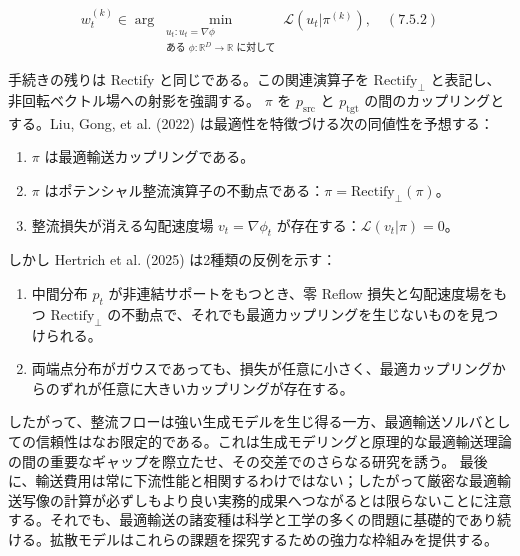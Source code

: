 \[
w_t^{(k)}\in\arg\min_{\substack{u_t:u_t=\nabla\phi\\\text{ある }\phi:\mathbb{R}^D\to\mathbb{R}\text{ に対して}}}\mathcal{L}(u_t|\pi^{(k)}), \quad (7.5.2)
\]


手続きの残りは Rectify と同じである。この関連演算子を $\mathrm{Rectify}_\perp$ と表記し、非回転ベクトル場への射影を強調する。
$\pi$ を $p_{\mathrm{src}}$ と $p_{\mathrm{tgt}}$ の間のカップリングとする。Liu, Gong, et al. (2022) は最適性を特徴づける次の同値性を予想する：

\begin{enumerate}
\item $\pi$ は最適輸送カップリングである。
\item $\pi$ はポテンシャル整流演算子の不動点である：$\pi=\mathrm{Rectify}_\perp(\pi)$。
\item 整流損失が消える勾配速度場 $v_t=\nabla\phi_t$ が存在する：$\mathcal{L}(v_t|\pi)=0$。
\end{enumerate}


しかし Hertrich et al. (2025) は2種類の反例を示す：

\begin{enumerate}
\item 中間分布 $p_t$ が非連結サポートをもつとき、零 Reflow 損失と勾配速度場をもつ $\mathrm{Rectify}_\perp$ の不動点で、それでも最適カップリングを生じないものを見つけられる。
\item 両端点分布がガウスであっても、損失が任意に小さく、最適カップリングからのずれが任意に大きいカップリングが存在する。
\end{enumerate}


したがって、整流フローは強い生成モデルを生じ得る一方、最適輸送ソルバとしての信頼性はなお限定的である。これは生成モデリングと原理的な最適輸送理論の間の重要なギャップを際立たせ、その交差でのさらなる研究を誘う。
最後に、輸送費用は常に下流性能と相関するわけではない；したがって厳密な最適輸送写像の計算が必ずしもより良い実務的成果へつながるとは限らないことに注意する。それでも、最適輸送の諸変種は科学と工学の多くの問題に基礎的であり続ける。拡散モデルはこれらの課題を探究するための強力な枠組みを提供する。

